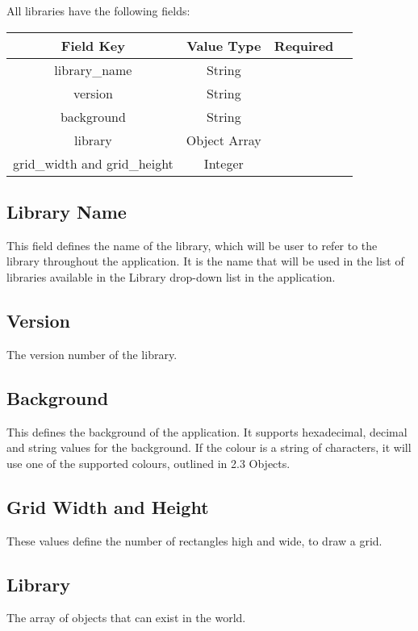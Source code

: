 \documentclass{article}
\begin{document}
	All libraries have the following fields:\\
	\begin{tabular}{|c|c|c|c|}
		\hline
		\textbf{Field Key} & \textbf{Value Type} &  \textbf{Required}\\
		
		\hline
		library\_name & String & \checkmark\\
		
		\hline
		version & String & \\
		
		\hline
		background & String & \\
		
		\hline
		library & Object Array  & \checkmark\\
		
		\hline
		grid\_width and grid\_height & Integer & \\
		\hline
		
	\end{tabular}
		
	\subsection*{Library Name}
	
	This field defines the name of the library, which will be user to refer to the library throughout the application. It is the name that will be used in the list of libraries available in the Library drop-down list in the application.
	
	\subsection*{Version}
	The version number of the library.
	
	\subsection*{Background}
	This defines the background of the application. It supports hexadecimal, decimal and string values for the background. If the colour is a string of characters, it will use one of the supported colours, outlined in 2.3 Objects.
	
	\subsection*{Grid Width and Height}
	These values define the number of rectangles high and wide, to draw a grid. 
	
	\subsection*{Library}
	The array of objects that can exist in the world. 
	
\end{document}
